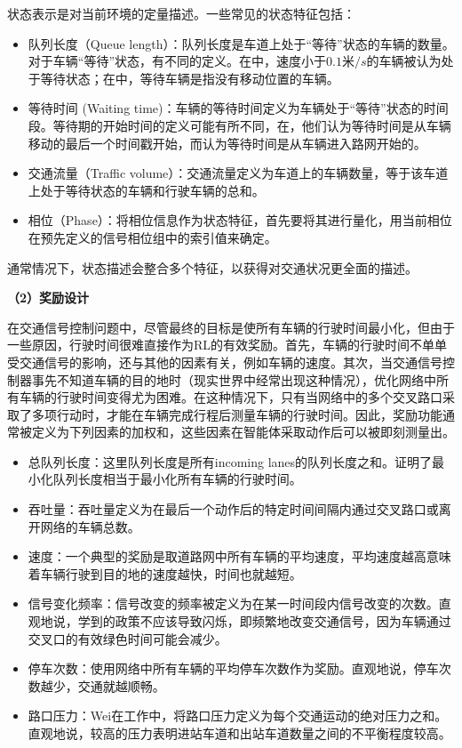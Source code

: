状态表示是对当前环境的定量描述。一些常见的状态特征包括：
\begin{itemize}
  \item 队列长度（Queue length）：队列长度是车道上处于“等待”状态的车辆的数量。对于车辆“等待”状态，有不同的定义。在中，速度小于$0.1\text{米}/s$的车辆被认为处于等待状态；在中，等待车辆是指没有移动位置的车辆。
  \item 等待时间 (Waiting time)：车辆的等待时间定义为车辆处于“等待”状态的时间段。等待期的开始时间的定义可能有所不同，在，他们认为等待时间是从车辆移动的最后一个时间戳开始，而认为等待时间是从车辆进入路网开始的。
  \item 交通流量（Traffic volume）：交通流量定义为车道上的车辆数量，等于该车道上处于等待状态的车辆和行驶车辆的总和。
  \item 相位（Phase）：将相位信息作为状态特征，首先要将其进行量化，用当前相位在预先定义的信号相位组中的索引值来确定。
\end{itemize}
通常情况下，状态描述会整合多个特征，以获得对交通状况更全面的描述。

\textbf{（2）奖励设计}

在交通信号控制问题中，尽管最终的目标是使所有车辆的行驶时间最小化，但由于一些原因，行驶时间很难直接作为RL的有效奖励。首先，车辆的行驶时间不单单受交通信号的影响，还与其他的因素有关，例如车辆的速度。其次，当交通信号控制器事先不知道车辆的目的地时（现实世界中经常出现这种情况），优化网络中所有车辆的行驶时间变得尤为困难。在这种情况下，只有当网络中的多个交叉路口采取了多项行动时，才能在车辆完成行程后测量车辆的行驶时间。因此，奖励功能通常被定义为下列因素的加权和，这些因素在智能体采取动作后可以被即刻测量出。
\begin{itemize}
  \item 总队列长度：这里队列长度是所有incoming lanes的队列长度之和。证明了最小化队列长度相当于最小化所有车辆的行驶时间。
  \item 吞吐量：吞吐量定义为在最后一个动作后的特定时间间隔内通过交叉路口或离开网络的车辆总数\cite{aslani2017adaptive,wei2018intellilight}。
  \item 速度：一个典型的奖励是取道路网中所有车辆的平均速度，平均速度越高意味着车辆行驶到目的地的速度越快，时间也就越短\cite{casas2017deep,van2016coordinated}。
  \item 信号变化频率：信号改变的频率被定义为在某一时间段内信号改变的次数。直观地说，学到的政策不应该导致闪烁，即频繁地改变交通信号，因为车辆通过交叉口的有效绿色时间可能会减少\cite{van2016coordinated,wei2018intellilight}。
  \item 停车次数：使用网络中所有车辆的平均停车次数作为奖励。直观地说，停车次数越少，交通就越顺畅\cite{van2016coordinated}。
  \item 路口压力：Wei在工作中，将路口压力定义为每个交通运动的绝对压力之和。直观地说，较高的压力表明进站车道和出站车道数量之间的不平衡程度较高。
\end{itemize}

